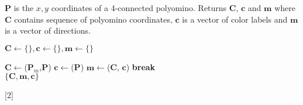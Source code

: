  
 
\begin{algorithm}
\newcommand\algotext[3]{\end{algorithmic}#3\begin{algorithmic}[3]}
\caption{($\mathbf{P})$}
$\mathbf{P}$ is the $x,y$ coordinates of a 4-connected polyomino. 
Returns $ \mathbf{C} $, $ \mathbf{c} $ and $\mathbf{m}$ where $ \mathbf{C} $ contains sequence of polyomino coordinates, $ \mathbf{c} $ is a vector of color labels and $\mathbf{m}$ is a vector of directions.
\begin{algorithmic}[3]
\hbox{$\mathbf{C} \leftarrow \{\},\mathbf{c} \leftarrow \{\}, \mathbf{m} \leftarrow \{\}$}
 
\State$\mathbf{C}\leftarrow${}($\mathbf{P}_m$,$\mathbf{P}$)
\State$\mathbf{c}\leftarrow${}($\mathbf{P}$)
\State$ \mathbf{m}\leftarrow${}($\mathbf{C}$, $\mathbf{c}$)
\State \textbf{break}
\EndIf
\EndFor\\
\Return 
\State$\{ \mathbf{C}, \mathbf{m},\mathbf{c} \}$ 
\end{algorithmic}[2]
\end{algorithm} 
  
 
 
